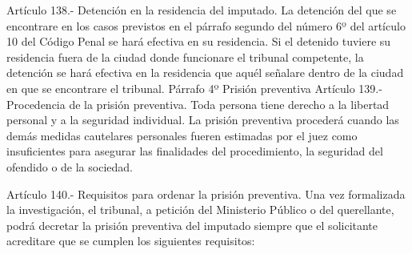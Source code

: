     Artículo 138.- Detención en la residencia del imputado. La detención del que se encontrare en los casos previstos en el párrafo segundo del número 6º del artículo 10 del Código Penal se hará efectiva en su residencia. Si el detenido tuviere su residencia fuera de la ciudad donde funcionare el tribunal competente, la detención se hará efectiva en la residencia que aquél señalare dentro de la ciudad en que se encontrare el tribunal.
    Párrafo 4º Prisión preventiva
    Artículo 139.- Procedencia de la prisión preventiva. Toda persona tiene derecho a la libertad personal y a la seguridad individual.
    La prisión preventiva procederá cuando las demás medidas cautelares personales fueren estimadas por el juez como insuficientes para asegurar las finalidades del procedimiento, la seguridad del ofendido o de la sociedad.

    Artículo 140.- Requisitos para ordenar la prisión preventiva. Una vez formalizada la investigación, el tribunal, a petición del Ministerio Público o del querellante, podrá decretar la prisión preventiva del imputado siempre que el solicitante acreditare que se cumplen los siguientes requisitos:

